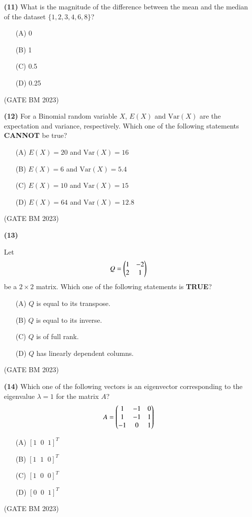 \documentclass[journal]{IEEEtran}
\numberwithin{equation}{enumi}
\numberwithin{figure}{enumi}
\begin{document}
\textbf{(11)} What is the magnitude of the difference between the mean and the median of the dataset \(\{1, 2, 3, 4, 6, 8\}\)?

\begin{enumerate}
    \item[(A)] 0
    \item[(B)] 1
    \item[(C)] 0.5
    \item[(D)] 0.25
\end{enumerate}
\hfill (GATE BM 2023)

    \textbf{(12)}
For a Binomial random variable \(X\), \(E(X)\) and \(\text{Var}(X)\) are the expectation and variance, respectively. Which one of the following statements \textbf{CANNOT} be true?

\begin{enumerate}
    \item[(A)] \(E(X) = 20\) and \(\text{Var}(X) = 16\)
    \item[(B)] \(E(X) = 6\) and \(\text{Var}(X) = 5.4\)
    \item[(C)] \(E(X) = 10\) and \(\text{Var}(X) = 15\)
    \item[(D)] \(E(X) = 64\) and \(\text{Var}(X) = 12.8\)
\end{enumerate}
\hfill (GATE BM 2023)

\textbf{(13)}

Let 
\[
Q = \begin{pmatrix}
1 & -2 \\
2 & 1
\end{pmatrix}
\]
be a \(2 \times 2\) matrix. Which one of the following statements is \textbf{TRUE}?

\begin{enumerate}
    \item[(A)] \(Q\) is equal to its transpose.
    \item[(B)] \(Q\) is equal to its inverse.
    \item[(C)] \(Q\) is of full rank.
    \item[(D)] \(Q\) has linearly dependent columns.
\end{enumerate}
\hfill (GATE BM 2023)

\textbf{(14)}
Which one of the following vectors is an eigenvector corresponding to the eigenvalue \(\lambda = 1\) for the matrix \(A\)?
\[
A = \begin{pmatrix}
1 & -1 & 0 \\
1 & -1 & 1 \\
-1 & 0 & 1
\end{pmatrix}
\]

\begin{enumerate}
    \item[(A)] \([1 \;\; 0 \;\; 1]^T\)
    \item[(B)] \([1 \;\; 1 \;\; 0]^T\)
    \item[(C)] \([1 \;\; 0 \;\; 0]^T\)
    \item[(D)] \([0 \;\; 0 \;\; 1]^T\)
\end{enumerate}
\hfill (GATE BM 2023)
\end{document}
